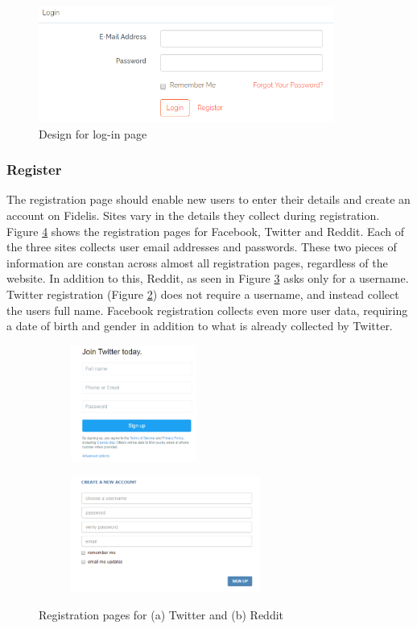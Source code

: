 \begin{figure}[H]
\centering
\includegraphics[height=1.5in]{Images/Design/login-page}
\caption{Design for log-in page}
\label{fig:login-page}
\end{figure}

\subsubsection{Register}
The registration page should enable new users to enter their details and create an account on Fidelis. Sites vary in the details they collect during registration. Figure \ref{fig:reg-pages} shows the registration pages for Facebook, Twitter and Reddit. Each of the three sites collects user email addresses and passwords. These two pieces of information are constan across almost all registration pages, regardless of the website. In addition to this, Reddit, as seen in Figure \ref{fig:reddit-reg} asks only for a username. Twitter registration (Figure \ref{fig:twitter-reg}) does not require a username, and instead collect the users full name. Facebook registration collects even more user data, requiring a date of birth and gender in addition to what is already collected by Twitter. 

\begin{figure}
\centering
\begin{subfigure}[b]{.4\linewidth}
	\includegraphics[height=1.5in]{Images/Design/twitter-reg}
	\caption{}
	\label{fig:twitter-reg}
\end{subfigure}
\begin{subfigure}[b]{.5\linewidth}
	\centering
	\includegraphics[height=1.5in]{Images/Design/reddit-reg}
	\caption{}
	\label{fig:reddit-reg}
\end{subfigure}
\caption{Registration pages for (a) Twitter and (b) Reddit}
\label{fig:reg-pages}
\end{figure}

